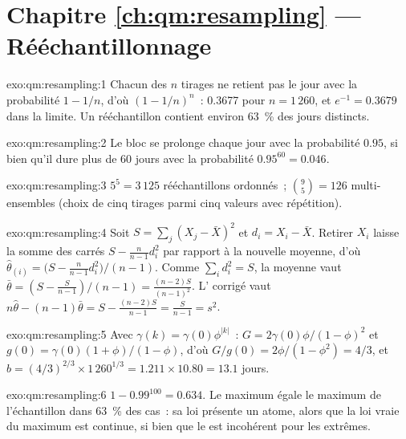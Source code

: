 \section*{Chapitre \ref{ch:qm:resampling} --- Rééchantillonnage}

\begin{solution}{exo:qm:resampling:1}
Chacun des $n$ tirages ne retient pas le jour avec la probabilité $1 - 1/n$, d'où $(1 - 1/n)^n$~: 0.3677 pour $n = 1\,260$, et $e^{-1} = 0.3679$ dans la
limite. Un rééchantillon contient environ 63~\% des jours distincts.
\end{solution}

\begin{solution}{exo:qm:resampling:2}
Le bloc se prolonge chaque jour avec la probabilité $0.95$, si bien qu'il dure plus de 60 jours avec la probabilité $0.95^{60} = 0.046$.
\end{solution}

\begin{solution}{exo:qm:resampling:3}
$5^5 = 3\,125$ rééchantillons ordonnés~; $\binom{9}{5} = 126$ multi-ensembles (choix de cinq tirages parmi cinq valeurs avec répétition).
\end{solution}

\begin{solution}{exo:qm:resampling:4}
Soit $S = \sum_j(X_j - \bar X)^2$ et $d_i = X_i - \bar X$. Retirer $X_i$ laisse la somme des carrés $S - \frac{n}{n-1}d_i^2$ par rapport à la nouvelle
moyenne, d'où $\hat\theta_{(i)} = \bigl(S - \frac{n}{n-1}d_i^2\bigr)/(n - 1)$. Comme $\sum_i d_i^2 = S$, la moyenne vaut $\bar\theta = (S - \frac{S}{n-1})/(n
- 1) = \frac{(n-2)S}{(n-1)^2}$. L' corrigé vaut $n\hat\theta - (n - 1)\bar\theta = S - \frac{(n-2)S}{n-1} = \frac{S}{n-1} = s^2$.
\end{solution}

\begin{solution}{exo:qm:resampling:5}
Avec $\gamma(k) = \gamma(0)\phi^{|k|}$~: $G = 2\gamma(0)\phi/(1 - \phi)^2$ et $g(0) = \gamma(0)(1 + \phi)/(1 - \phi)$, d'où $G/g(0) = 2\phi/(1 -
\phi^2) = 4/3$, et $b = (4/3)^{2/3} \times 1\,260^{1/3} = 1.211 \times 10.80 = 13.1$ jours.
\end{solution}

\begin{solution}{exo:qm:resampling:6}
$1 - 0.99^{100} = 0.634$. Le maximum  égale le maximum de l'échantillon dans 63~\% des cas~: sa loi présente un atome, alors que la loi vraie du
maximum est continue, si bien que le  est incohérent pour les extrêmes.
\end{solution}

